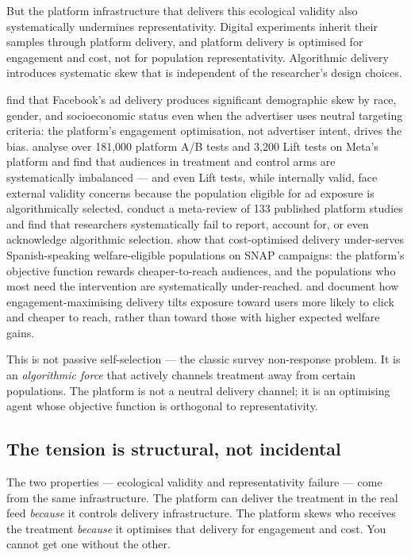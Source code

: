 But the platform infrastructure that delivers this ecological validity also systematically undermines representativity. Digital experiments inherit their samples through platform delivery, and platform delivery is optimised for engagement and cost, not for population representativity. Algorithmic delivery introduces systematic skew that is independent of the researcher's design choices.

\citet{Ali2019} find that Facebook's ad delivery produces significant demographic skew by race, gender, and socioeconomic status even when the advertiser uses neutral targeting criteria: the platform's engagement optimisation, not advertiser intent, drives the bias. \citet{Burtch2025} analyse over 181,000 platform A/B tests and 3,200 Lift tests on Meta's platform and find that audiences in treatment and control arms are systematically imbalanced --- and even Lift tests, while internally valid, face external validity concerns because the population eligible for ad exposure is algorithmically selected. \citet{Boegershausen2025} conduct a meta-review of 133 published platform studies and find that researchers systematically fail to report, account for, or even acknowledge algorithmic selection. \citet{Koenecke2023} show that cost-optimised delivery under-serves Spanish-speaking welfare-eligible populations on SNAP campaigns: the platform's objective function rewards cheaper-to-reach audiences, and the populations who most need the intervention are systematically under-reached. \citet{lambrecht2019algorithmic} and \citet{sapiezynski2022algorithms} document how engagement-maximising delivery tilts exposure toward users more likely to click and cheaper to reach, rather than toward those with higher expected welfare gains.

This is not passive self-selection --- the classic survey non-response problem. It is an \emph{algorithmic force} that actively channels treatment away from certain populations. The platform is not a neutral delivery channel; it is an optimising agent whose objective function is orthogonal to representativity.

\subsection{The tension is structural, not incidental}

The two properties --- ecological validity and representativity failure --- come from the same infrastructure. The platform can deliver the treatment in the real feed \emph{because} it controls delivery infrastructure. The platform skews who receives the treatment \emph{because} it optimises that delivery for engagement and cost. You cannot get one without the other.

